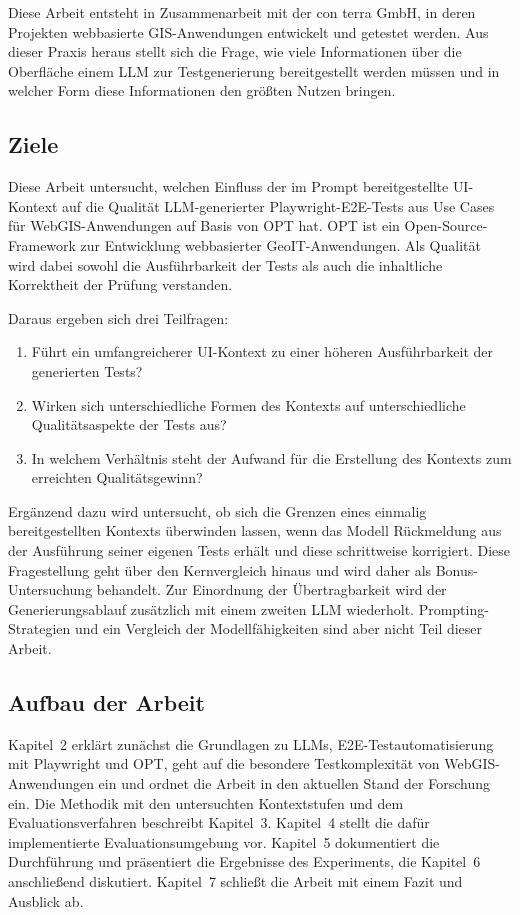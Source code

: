 Diese Arbeit entsteht in Zusammenarbeit mit der con terra GmbH, in deren Projekten webbasierte \ac{GIS}-Anwendungen entwickelt und getestet werden. Aus dieser Praxis heraus stellt sich die Frage, wie viele Informationen über die Oberfläche einem \ac{LLM} zur Testgenerierung bereitgestellt werden müssen und in welcher Form diese Informationen den größten Nutzen bringen.

\subsection{Ziele}

Diese Arbeit untersucht, welchen Einfluss der im Prompt bereitgestellte \ac{UI}-Kontext auf die Qualität \ac{LLM}-generierter Playwright-\ac{E2E}-Tests aus Use Cases für WebGIS-Anwendungen auf Basis von \ac{OPT} hat. \ac{OPT} ist ein Open-Source-Framework zur Entwicklung webbasierter GeoIT-Anwendungen. Als Qualität wird dabei sowohl die Ausführbarkeit der Tests als auch die inhaltliche Korrektheit der Prüfung verstanden.

Daraus ergeben sich drei Teilfragen:

\begin{enumerate}
    \item Führt ein umfangreicherer \ac{UI}-Kontext zu einer höheren Ausführbarkeit der generierten Tests?
    \item Wirken sich unterschiedliche Formen des Kontexts auf unterschiedliche Qualitätsaspekte der Tests aus?
    \item In welchem Verhältnis steht der Aufwand für die Erstellung des Kontexts zum erreichten Qualitätsgewinn?
\end{enumerate}

Ergänzend dazu wird untersucht, ob sich die Grenzen eines einmalig bereitgestellten Kontexts überwinden lassen, wenn das Modell Rückmeldung aus der Ausführung seiner eigenen Tests erhält und diese schrittweise korrigiert. Diese Fragestellung geht über den Kernvergleich hinaus und wird daher als Bonus-Untersuchung behandelt. Zur Einordnung der Übertragbarkeit wird der Generierungsablauf zusätzlich mit einem zweiten \ac{LLM} wiederholt. Prompting-Strategien und ein Vergleich der Modellfähigkeiten sind aber nicht Teil dieser Arbeit.

\subsection{Aufbau der Arbeit}

Kapitel~2 erklärt zunächst die Grundlagen zu \acp{LLM}, \ac{E2E}-Testautomatisierung mit Playwright und \ac{OPT}, geht auf die besondere Testkomplexität von WebGIS-Anwendungen ein und ordnet die Arbeit in den aktuellen Stand der Forschung ein. Die Methodik mit den untersuchten Kontextstufen und dem Evaluationsverfahren beschreibt Kapitel~3. Kapitel~4 stellt die dafür implementierte Evaluationsumgebung vor. Kapitel~5 dokumentiert die Durchführung und präsentiert die Ergebnisse des Experiments, die Kapitel~6 anschließend diskutiert. Kapitel~7 schließt die Arbeit mit einem Fazit und Ausblick ab.